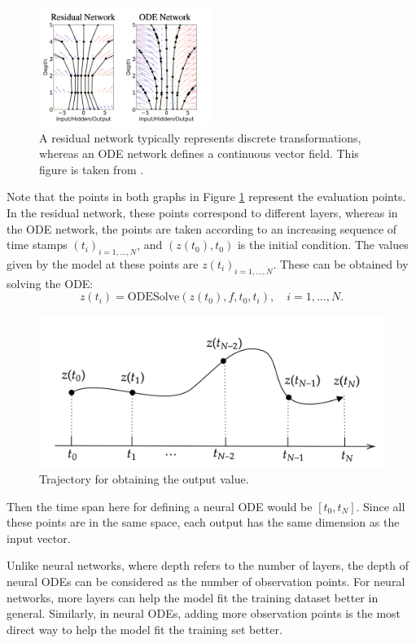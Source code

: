 \documentclass[a4paper,11pt,titlepage]{article}
\theoremstyle{definition}
\theoremstyle{plain}
\theoremstyle{remark}
\begin{document}
\begin{figure}[htbp]
    \centering
    \includegraphics[width=0.5\textwidth]{report/figures/ResNetvsODENet.png}
    \caption{A residual network typically represents discrete transformations, whereas an ODE network defines a continuous vector field. This figure is taken from \cite{chen2018neural}.}
    \label{fig:resnettoneuralODE}
\end{figure}

Note that the points in both graphs in Figure \ref{fig:resnettoneuralODE} represent the evaluation points. In the residual network, these points correspond to different layers, whereas in the ODE network, the points are taken according to an increasing sequence of time stamps $(t_i)_{i=1,\dots,N}$, and $\left(z(t_0),t_0\right)$ is the initial condition. The values given by the model at these points are $z(t_i)_{i=1,\dots,N}$. These can be obtained by solving the ODE:
$$z(t_i)=\mathrm{ODESolve}\left(z(t_0),f,t_0,t_i\right),\quad i=1,\dots,N.$$

\begin{figure}[htbp]
    \centering
    \includegraphics[width=0.5\linewidth]{report/figures/ForwardODE.png}
    \caption{Trajectory for obtaining the output value.}
\end{figure}

Then the time span here for defining a neural ODE would be $[t_0,t_N]$. Since all these points are in the same space, each output has the same dimension as the input vector.

Unlike neural networks, where depth refers to the number of layers, the depth of neural ODEs can be considered as the number of observation points. For neural networks, more layers can help the model fit the training dataset better in general. Similarly, in neural ODEs, adding more observation points is the most direct way to help the model fit the training set better.
\end{document}
